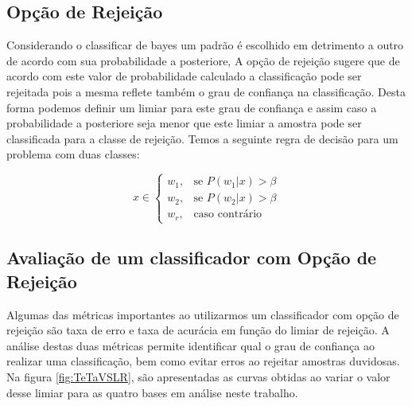\documentclass[ 
	article,			%
	11pt,				%
	oneside,			%
	a4paper,			%
	english,			%
	brazil,				%
	]{abntex2}
\begin{document}
\subsection{Opção de Rejeição}
Considerando o classificar de bayes um padrão é escolhido em detrimento a outro
de acordo com sua probabilidade a posteriore, A opção de rejeição sugere que de
acordo com este valor de probabilidade calculado a classificação pode ser
rejeitada pois a mesma reflete também o grau de confiança na classificação.
Desta forma podemos definir um limiar para este grau de confiança e assim caso a
probabilidade a posteriore seja menor que este limiar a amostra pode ser
classificada para a classe de rejeição. Temos a seguinte regra de
decisão para um problema com duas classes:

\begin{equation}
x \in \begin{cases}
		w_1,& \text{se }  P(w_1|x) > \beta \\
		w_2,& \text{se }  P(w_2|x) > \beta \\
		w_r,& \text{caso contrário }
	  \end{cases}
\end{equation}

\subsection{Avaliação de um classificador com Opção de Rejeição}
Algumas das métricas importantes ao utilizarmos um classificador com opção de
rejeição são taxa de erro e taxa de acurácia em função do limiar de rejeição. A
análise destas duas métricas permite identificar qual o grau de confiança ao
realizar uma classificação, bem como evitar erros ao rejeitar amostras
duvidosas. Na figura \ref{fig:TeTaVSLR}, são apresentadas as curvas obtidas
ao variar o valor desse limiar para as quatro bases em análise neste trabalho.
\end{document}
